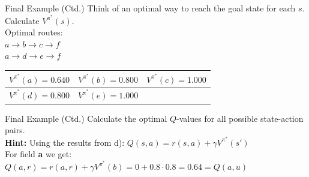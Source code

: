 \begin{frame}{Final Example (Ctd.)}{}
	 Think of an optimal way to reach the goal state for each $s$. Calculate $V^{\pi^*}(s)$. \\[5mm]
	
	Optimal routes: \\
	$a \longrightarrow b \longrightarrow c \longrightarrow f$ \\
	$a \longrightarrow d \longrightarrow e \longrightarrow f$

	\begin{table}
		\centering
		\begin{tabular}{| c | c | c |}
			\hline
			$V^{\pi^*}(a) = 0.640$		& 	$V^{\pi^*}(b) = 0.800$ 	&	$V^{\pi^*}(c) = 1.000$ 	\\ \hline
			$V^{\pi^*}(d) = 0.800$		&	$V^{\pi^*}(e) = 1.000$	&						\\ \hline
		\end{tabular}
	\end{table}
\end{frame}


\begin{frame}{Final Example (Ctd.)}{}
	 Calculate the optimal $Q$-values for all possible state-action pairs. \\[5mm]
	
	\textbf{Hint:} Using the results from d): $Q(s, a) = r(s, a) + \gamma V^{\pi^*}(s')$ \\[5mm]
	
	For field \textbf{a} we get: \\
	$Q(a, r) = r(a, r) + \gamma V^{\pi^*}(b) = 0 + 0.8 \cdot 0.8 = 0.64 = Q(a, u)$
	
	\begin{table}
		\centering
	\end{table}
\end{frame}


